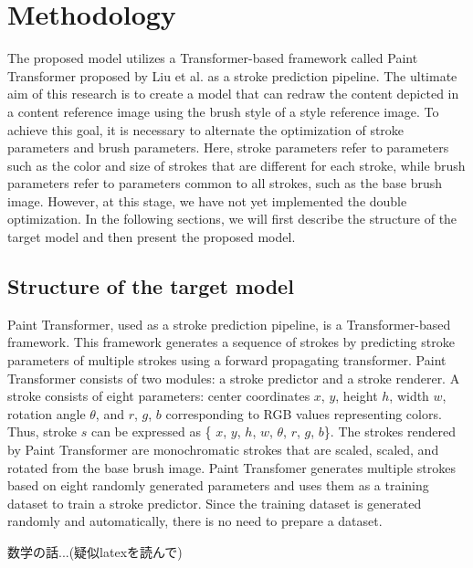 \documentclass{mva_style}
\begin{document}
\section{Methodology}
The proposed model utilizes a Transformer-based framework called Paint 
Transformer proposed by Liu et al.\cite{PaintTransformer} as a stroke prediction 
pipeline. The ultimate aim of this research is to create a model that can 
redraw the content depicted in a content reference image using the brush 
style of a style reference image. To achieve this goal, it is necessary to 
alternate the optimization of stroke parameters and brush parameters.
Here, stroke parameters refer to parameters such as the color and size of 
strokes that are different for each stroke, while brush parameters refer to 
parameters common to all strokes, such as the base brush image.
However, at this stage, we have not yet implemented the double optimization.
In the following sections, we will first describe the structure of the 
target model and then present the proposed model.

\subsection{Structure of the target model}
Paint Transformer, used as a stroke prediction pipeline, is a Transformer-based 
framework. This framework generates a sequence of strokes by predicting 
stroke parameters of multiple strokes using a forward propagating transformer.
Paint Transformer consists of two modules: a stroke predictor and a stroke 
renderer. 
A stroke consists of eight parameters: center coordinates $x$, $y$, height $h$,
width $w$, rotation angle $\theta$, and $r$, $g$, $b$ corresponding to RGB values 
representing colors. Thus, stroke $s$ can be expressed as \{ $x$, $y$, $h$, $w$, $\theta$, $r$, $g$, $b$\}.
The strokes rendered by Paint Transformer are monochromatic strokes that are 
scaled, scaled, and rotated from the base brush image. 
Paint Transfomer generates multiple strokes based on eight randomly generated 
parameters and uses them as a training dataset to train a stroke predictor. 
Since the training dataset is generated randomly and automatically, there is 
no need to prepare a dataset. 

数学の話...(疑似latexを読んで)
\end{document}
